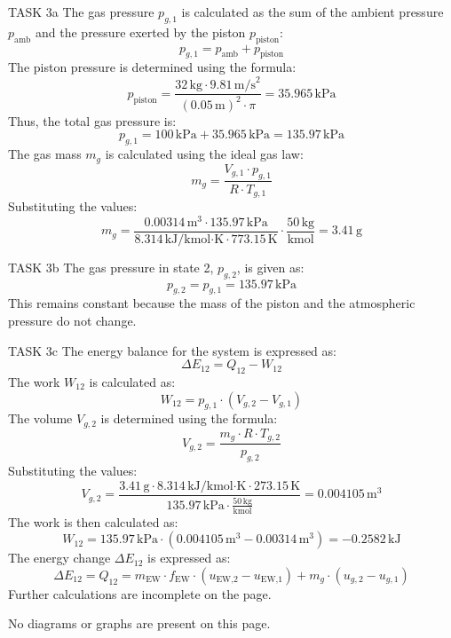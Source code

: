 TASK 3a  
The gas pressure \( p_{g,1} \) is calculated as the sum of the ambient pressure \( p_{\text{amb}} \) and the pressure exerted by the piston \( p_{\text{piston}} \):  
\[
p_{g,1} = p_{\text{amb}} + p_{\text{piston}}
\]  
The piston pressure is determined using the formula:  
\[
p_{\text{piston}} = \frac{32 \, \text{kg} \cdot 9.81 \, \text{m/s}^2}{\left(0.05 \, \text{m}\right)^2 \cdot \pi} = 35.965 \, \text{kPa}
\]  
Thus, the total gas pressure is:  
\[
p_{g,1} = 100 \, \text{kPa} + 35.965 \, \text{kPa} = 135.97 \, \text{kPa}
\]  
The gas mass \( m_g \) is calculated using the ideal gas law:  
\[
m_g = \frac{V_{g,1} \cdot p_{g,1}}{R \cdot T_{g,1}}
\]  
Substituting the values:  
\[
m_g = \frac{0.00314 \, \text{m}^3 \cdot 135.97 \, \text{kPa}}{8.314 \, \text{kJ}/\text{kmol·K} \cdot 773.15 \, \text{K}} \cdot \frac{50 \, \text{kg}}{\text{kmol}} = 3.41 \, \text{g}
\]  

TASK 3b  
The gas pressure in state 2, \( p_{g,2} \), is given as:  
\[
p_{g,2} = p_{g,1} = 135.97 \, \text{kPa}
\]  
This remains constant because the mass of the piston and the atmospheric pressure do not change.  

TASK 3c  
The energy balance for the system is expressed as:  
\[
\Delta E_{12} = Q_{12} - W_{12}
\]  
The work \( W_{12} \) is calculated as:  
\[
W_{12} = p_{g,1} \cdot \left(V_{g,2} - V_{g,1}\right)
\]  
The volume \( V_{g,2} \) is determined using the formula:  
\[
V_{g,2} = \frac{m_g \cdot R \cdot T_{g,2}}{p_{g,2}}
\]  
Substituting the values:  
\[
V_{g,2} = \frac{3.41 \, \text{g} \cdot 8.314 \, \text{kJ}/\text{kmol·K} \cdot 273.15 \, \text{K}}{135.97 \, \text{kPa} \cdot \frac{50 \, \text{kg}}{\text{kmol}}} = 0.004105 \, \text{m}^3
\]  
The work is then calculated as:  
\[
W_{12} = 135.97 \, \text{kPa} \cdot \left(0.004105 \, \text{m}^3 - 0.00314 \, \text{m}^3\right) = -0.2582 \, \text{kJ}
\]  
The energy change \( \Delta E_{12} \) is expressed as:  
\[
\Delta E_{12} = Q_{12} = m_{\text{EW}} \cdot f_{\text{EW}} \cdot \left(u_{\text{EW,2}} - u_{\text{EW,1}}\right) + m_g \cdot \left(u_{g,2} - u_{g,1}\right)
\]  
Further calculations are incomplete on the page.  

No diagrams or graphs are present on this page.